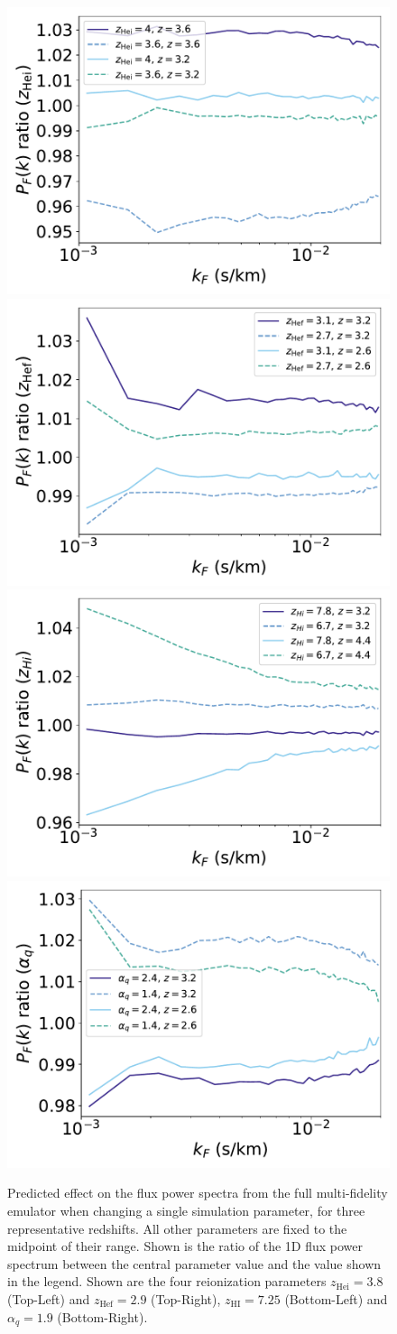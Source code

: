 \documentclass[a4paper,11pt]{article}
\begin{document}
\begin{figure}
    \centering
	\includegraphics[width=0.48\columnwidth]{figures/single_param_herei.pdf}
    \includegraphics[width=0.48\columnwidth]{figures/single_param_heref.pdf} \\
	\includegraphics[width=0.48\columnwidth]{figures/single_param_hireionz.pdf}
    \includegraphics[width=0.48\columnwidth]{figures/single_param_alphaq.pdf}
    \caption{Predicted effect on the flux power spectra from the full multi-fidelity emulator when changing a single simulation parameter, for three representative redshifts. All other parameters are fixed to the midpoint of their range. Shown is the ratio of the 1D flux power spectrum between the central parameter value and the value shown in the legend. Shown are the four reionization parameters $z_\mathrm{Hei} = 3.8$ (Top-Left) and $z_\mathrm{Hef} = 2.9$ (Top-Right), $z_\mathrm{HI} = 7.25$ (Bottom-Left) and $\alpha_q =1.9$ (Bottom-Right).}
    \label{fig:zhefluxpower}
\end{figure}
\end{document}
